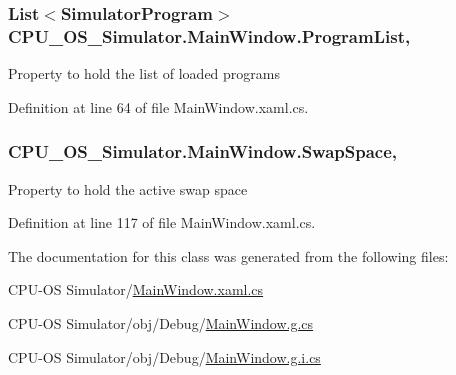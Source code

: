 \subsubsection[{Program\+List}]{\setlength{\rightskip}{0pt plus 5cm}List$<${\bf Simulator\+Program}$>$ C\+P\+U\+\_\+\+O\+S\+\_\+\+Simulator.\+Main\+Window.\+Program\+List\hspace{0.3cm}{\ttfamily [get]}, {\ttfamily [set]}}\label{class_c_p_u___o_s___simulator_1_1_main_window_a632c91cdd16a7498bbb8dfb3e5df252c}


Property to hold the list of loaded programs 



Definition at line 64 of file Main\+Window.\+xaml.\+cs.

\hypertarget{class_c_p_u___o_s___simulator_1_1_main_window_a114d0bf1ca63b0d9213537758535aecf}{}
\subsubsection[{Swap\+Space}]{ C\+P\+U\+\_\+\+O\+S\+\_\+\+Simulator.\+Main\+Window.\+Swap\+Space\hspace{0.3cm}{\ttfamily [get]}, {\ttfamily [set]}}\label{class_c_p_u___o_s___simulator_1_1_main_window_a114d0bf1ca63b0d9213537758535aecf}


Property to hold the active swap space 



Definition at line 117 of file Main\+Window.\+xaml.\+cs.



The documentation for this class was generated from the following files\+:\begin{DoxyCompactItemize}
\item 
C\+P\+U-\/\+O\+S Simulator/\hyperlink{_c_p_u-_o_s_01_simulator_2_main_window_8xaml_8cs}{Main\+Window.\+xaml.\+cs}\item 
C\+P\+U-\/\+O\+S Simulator/obj/\+Debug/\hyperlink{_c_p_u-_o_s_01_simulator_2obj_2_debug_2_main_window_8g_8cs}{Main\+Window.\+g.\+cs}\item 
C\+P\+U-\/\+O\+S Simulator/obj/\+Debug/\hyperlink{_c_p_u-_o_s_01_simulator_2obj_2_debug_2_main_window_8g_8i_8cs}{Main\+Window.\+g.\+i.\+cs}\end{DoxyCompactItemize}
